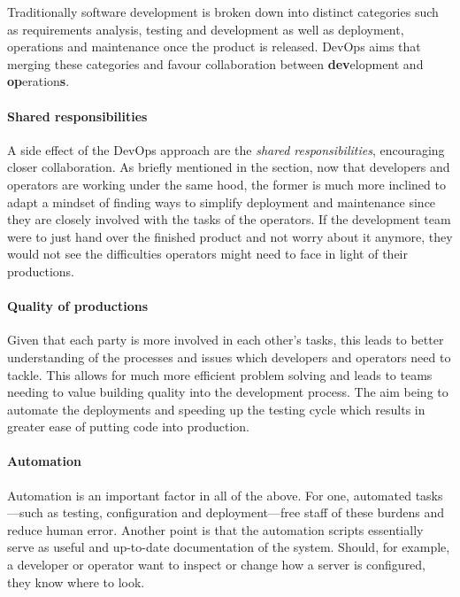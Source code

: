 Traditionally software development is broken down into distinct
categories such as requirements analysis, testing and development as
well as deployment, operations and maintenance once the product is
released. DevOps aims that merging these categories and favour
collaboration between \textbf{dev}elopment and
\textbf{op}eration\textbf{s}. \cite{devops-culture}

\paragraph{Shared responsibilities}

A side effect of the DevOps approach are the \textit{shared
responsibilities}, encouraging closer collaboration. As briefly
mentioned in the  section, now that
developers and operators are working under the same hood, the former
is much more inclined to adapt a mindset of finding ways to simplify
deployment and maintenance since they are closely involved with the
tasks of the operators. If the development team were to just hand over
the finished product and not worry about it anymore, they would not
see the difficulties operators might need to face in light of their
productions. \cite{devops-culture}

\paragraph{Quality of productions}

Given that each party is more involved in each other's tasks, this
leads to better understanding of the processes and issues which
developers and operators need to tackle. This allows for much more
efficient problem solving and leads to teams needing to value building
quality into the development process. The aim being to automate the
deployments and speeding up the testing cycle which results in greater
ease of putting code into production. \cite{devops-culture}

\paragraph{Automation}

Automation is an important factor in all of the above. For one,
automated tasks---such as testing, configuration and deployment---free
staff of these burdens and reduce human error. Another point is that
the automation scripts essentially serve as useful and up-to-date
documentation of the system. Should, for example, a developer or
operator want to inspect or change how a server is configured, they
know where to look. \cite{devops-culture}

